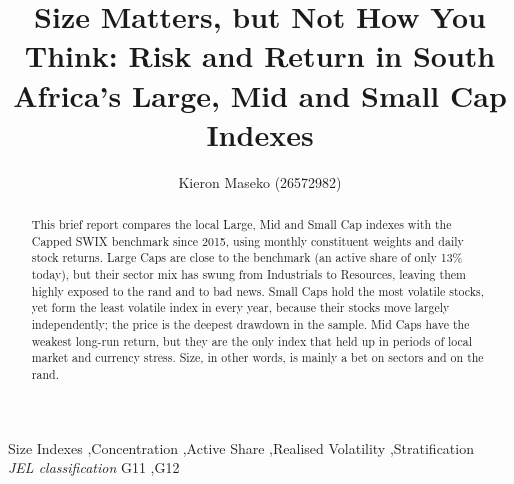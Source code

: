 \documentclass[11pt,preprint]{elsarticle}
\numberwithin{equation}{section}
\numberwithin{figure}{section}
\numberwithin{table}{section}
\begin{document}
\begin{frontmatter}  %

\title{Size Matters, but Not How You Think: Risk and Return in South
Africa's Large, Mid and Small Cap Indexes}





\author[Add1]{Kieron Maseko (26572982)}





\address[Add1]{Stellenbosch University, Stellenbosch, South Africa}


\begin{abstract}
\small{
This brief report compares the local Large, Mid and Small Cap indexes
with the Capped SWIX benchmark since 2015, using monthly constituent
weights and daily stock returns. Large Caps are close to the benchmark
(an active share of only 13\% today), but their sector mix has swung
from Industrials to Resources, leaving them highly exposed to the rand
and to bad news. Small Caps hold the most volatile stocks, yet form the
least volatile index in every year, because their stocks move largely
independently; the price is the deepest drawdown in the sample. Mid Caps
have the weakest long-run return, but they are the only index that held
up in periods of local market and currency stress. Size, in other words,
is mainly a bet on sectors and on the rand.
}
\end{abstract}

\vspace{1cm}


\begin{keyword}
\footnotesize{
Size Indexes \sep Concentration \sep Active Share \sep Realised
Volatility \sep Stratification \\
\vspace{0.3cm}
}
\footnotesize{
\textit{JEL classification} G11 \sep G12
}
\end{keyword}



\vspace{0.5cm}

\end{frontmatter}

\setcounter{footnote}{0}



\pagestyle{fancy}
\chead{}
\rhead{}
\lfoot{}
\lhead{}
\cfoot{}
\end{document}
